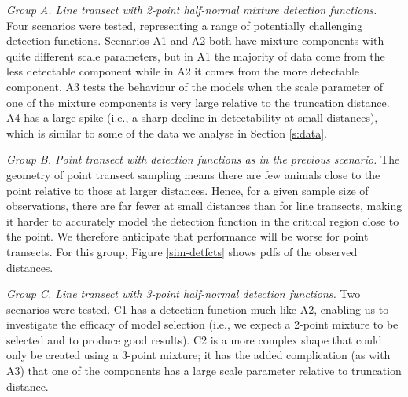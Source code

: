 \documentclass[useAMS,referee,usenatbib]{biom}
\begin{document}
\textit{Group A. Line transect with 2-point half-normal mixture detection functions.} Four scenarios were tested, representing a range of potentially challenging detection functions.  Scenarios A1 and A2 both have mixture components with quite different scale parameters, but in A1 the majority of data come from the less detectable component while in A2 it comes from the more detectable component.  A3 tests the behaviour of the models when the scale parameter of one of the mixture components is very large relative to the truncation distance. A4 has a large spike (i.e., a sharp decline in detectability at small distances), which is similar to some of the data we analyse in Section \ref{s:data}.

\textit{Group B. Point transect with detection functions as in the previous scenario.} The geometry of point transect sampling means there are few animals close to the point relative to those at larger distances. Hence, for a given sample size of observations, there are far fewer at small distances than for line transects, making it harder to accurately model the detection function in the critical region close to the point.  We therefore anticipate that performance will be worse for point transects. For this group, Figure \ref{sim-detfcts} shows pdfs of the observed distances.

\textit{Group C. Line transect with 3-point half-normal detection functions.} Two scenarios were tested. C1 has a detection function much like A2, enabling us to investigate the efficacy of model selection (i.e., we expect a 2-point mixture to be selected and to produce good results). C2 is a more complex shape that could only be created using a 3-point mixture; it has the added complication (as with A3) that one of the components has a large scale parameter relative to truncation distance.
\end{document}
